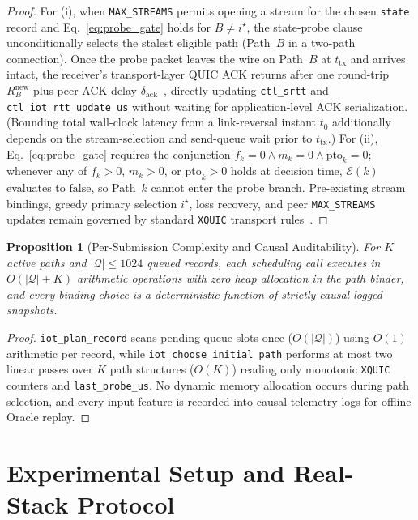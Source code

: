 \documentclass[preprint,12pt,number]{elsarticle}
\newtheorem{proposition}{Proposition}
\begin{document}
\begin{proof}
For (i), when \texttt{MAX\_STREAMS} permits opening a stream for the chosen \texttt{state} record and Eq.~\eqref{eq:probe_gate} holds for $B \neq i^\star$, the state-probe clause unconditionally selects the stalest eligible path (Path~$B$ in a two-path connection). Once the probe packet leaves the wire on Path~$B$ at $t_{\text{tx}}$ and arrives intact, the receiver's transport-layer QUIC ACK returns after one round-trip $R_B^{\text{new}}$ plus peer ACK delay $\delta_{\text{ack}}$~\cite{rfc9000,rfc9002}, directly updating \texttt{ctl\_srtt} and \texttt{ctl\_iot\_rtt\_update\_us} without waiting for application-level ACK serialization. (Bounding total wall-clock latency from a link-reversal instant $t_0$ additionally depends on the stream-selection and send-queue wait prior to $t_{\text{tx}}$.) For (ii), Eq.~\eqref{eq:probe_gate} requires the conjunction $f_k{=}0 \wedge m_k{=}0 \wedge \text{pto}_k{=}0$; whenever any of $f_k > 0$, $m_k > 0$, or $\text{pto}_k > 0$ holds at decision time, $\mathcal{E}(k)$ evaluates to $\text{false}$, so Path~$k$ cannot enter the probe branch. Pre-existing stream bindings, greedy primary selection $i^\star$, loss recovery, and peer \texttt{MAX\_STREAMS} updates remain governed by standard \texttt{XQUIC} transport rules~\cite{rfc9000,rfc9002}.
\end{proof}

\begin{proposition}[Per-Submission Complexity and Causal Auditability]
\label{prop:complex}
For $K$ active paths and $|\mathcal{Q}| \le 1024$ queued records, each scheduling call executes in $O(|\mathcal{Q}| + K)$ arithmetic operations with zero heap allocation in the path binder, and every binding choice is a deterministic function of strictly causal logged snapshots.
\end{proposition}
\begin{proof}
\texttt{iot\_plan\_record} scans pending queue slots once ($O(|\mathcal{Q}|)$) using $O(1)$ arithmetic per record, while \texttt{iot\_choose\_initial\_path} performs at most two linear passes over $K$ path structures ($O(K)$) reading only monotonic \texttt{XQUIC} counters and \texttt{last\_probe\_us}. No dynamic memory allocation occurs during path selection, and every input feature is recorded into causal telemetry logs for offline Oracle replay.
\end{proof}

\section{Experimental Setup and Real-Stack Protocol}
\label{sec:setup}
\end{document}
